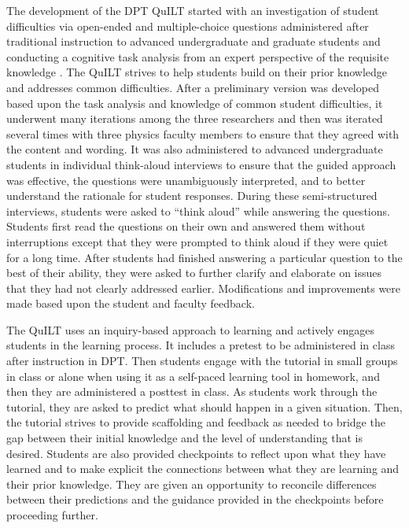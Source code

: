 \documentclass[aps,pra,showpacs,showkeys,twocolumn,groupedaddress]{revtex4-1}
\begin{document}
The development of the DPT QuILT started with an investigation of student difficulties via open-ended and multiple-choice questions administered after traditional instruction to advanced undergraduate and graduate students and conducting a cognitive task analysis from an expert perspective of the requisite knowledge \cite{cognitive}. The QuILT strives to help students build on their prior knowledge and addresses common difficulties. After a preliminary version was developed based upon the task analysis \cite{cognitive} and knowledge of common student difficulties, it underwent many iterations among the three researchers and then was iterated several times with three physics faculty members to ensure that they agreed with the content and wording. It was also administered to advanced undergraduate students in individual think-aloud interviews to ensure that the guided approach was effective, the questions were unambiguously interpreted, and to better understand the rationale for student responses. During these semi-structured interviews, students were asked to “think aloud” while answering the questions. Students first read the questions on their own and answered them without interruptions except that they were prompted to think aloud if they were quiet for a long time. After students had finished answering a particular question to the best of their ability, they were asked to further clarify and elaborate on issues that they had not clearly addressed earlier. Modifications and improvements were made based upon the student and faculty feedback. 

The QuILT uses an inquiry-based approach to learning and actively engages students in the learning process. It includes a pretest to be administered in class after instruction in DPT. Then students engage with the tutorial in small groups in class or alone when using it as a self-paced learning tool in homework, and then they are administered a posttest in class. As students work through the tutorial, they are asked to predict what should happen in a given situation. Then, the tutorial strives to provide scaffolding and feedback as needed to bridge the gap between their initial knowledge and the level of understanding that is desired.  Students are also provided checkpoints to reflect upon what they have learned and to make explicit the connections between what they are learning and their prior knowledge. They are given an opportunity to reconcile  differences between their predictions and  the guidance provided in the checkpoints before proceeding further. 
 
\end{document}
